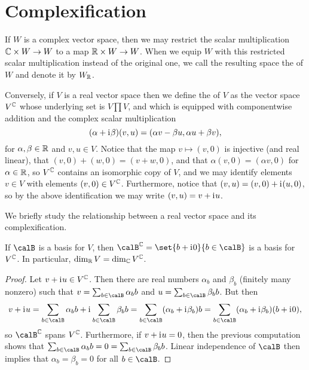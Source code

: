 \chapter{Complexification}

If $W$ is a complex vector space, then we may restrict the scalar multiplication $\mathbb{C} \times W \to W$ to a map $\mathbb{R} \times W \to W$. When we equip $W$ with this restricted scalar multiplication instead of the original one, we call the resulting space the  of $W$ and denote it by $W_{\mathbb{R}}$.

Conversely, if $V$ is a real vector space then we define the  of $V$ as the vector space $V^{\mathbb{C}}$ whose underlying set is $V \prod V$, and which is equipped with componentwise addition and the complex scalar multiplication
%
\begin{equation*}
    (\alpha + \mathrm{i}\mkern1mu \beta)(v,u)
        = (\alpha v - \beta u, \alpha u + \beta v),
\end{equation*}
%
for $\alpha,\beta \in \mathbb{R}$ and $v,u \in V$. Notice that the map $v \mapsto (v,0)$ is injective (and real linear), that $(v,0) + (w,0) = (v+w,0)$, and that $\alpha(v,0) = (\alpha v,0)$ for $\alpha \in \mathbb{R}$, so $V^{\mathbb{C}}$ contains an isomorphic copy of $V$, and we may identify elements $v \in V$ with elements $(v,0) \in V^{\mathbb{C}}$. Furthermore, notice that $(v,u) = (v,0) + \mathrm{i}\mkern1mu (u,0)$, so by the above identification we may write $(v,u) = v + \mathrm{i}\mkern1mu u$.


We briefly study the relationship between a real vector space and its complexification.

\begin{proposition}
    If $\calB$ is a basis for $V$, then $\calB^\complex = \set{b + \iu 0}{b \in \calB}$ is a basis for $V^{\mathbb{C}}$. In particular, $\dim_{\mathbb{R}} V = \dim_{\mathbb{C}} V^{\mathbb{C}}$.
\end{proposition}

\begin{proof}
    Let $v + \mathrm{i}\mkern1mu u \in V^{\mathbb{C}}$. Then there are real numbers $\alpha_b$ and $\beta_b$ (finitely many nonzero) such that $v = \sum_{b \in \calB} \alpha_b b$ and $u = \sum_{b \in \calB} \beta_b b$. But then
    \begin{equation*}
        v + \iu u
            = \sum_{b \in \calB} \alpha_b b
                + \iu \sum_{b \in \calB} \beta_b b
            = \sum_{b \in \calB} (\alpha_b + \iu \beta_b) b
            = \sum_{b \in \calB} (\alpha_b + \iu \beta_b) (b + \iu 0),
    \end{equation*}
    so $\calB^\complex$ spans $V^{\mathbb{C}}$. Furthermore, if $v + \mathrm{i}\mkern1mu u = 0$, then the previous computation shows that $\sum_{b \in \calB} \alpha_b b = 0 = \sum_{b \in \calB} \beta_b b$. Linear independence of $\calB$ then implies that $\alpha_b = \beta_b = 0$ for all $b \in \calB$.
\end{proof}

